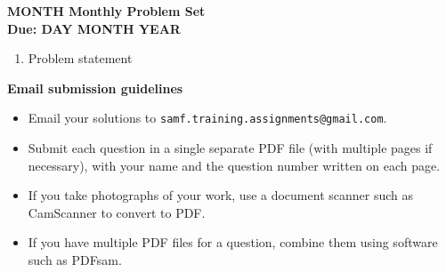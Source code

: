 \documentclass{article}
\begin{document}
\begin{center}
\textbf{\Large MONTH Monthly Problem Set}
\\ \vspace{1em}
\textbf{\large Due: DAY MONTH YEAR}
\end{center}

\begin{enumerate}[1.]

\item %
Problem statement

\end{enumerate}

\vfill
\textbf{\Large Email submission guidelines}
\begin{itemize}
	\item Email your solutions to \verb!samf.training.assignments@gmail.com!.
	\item Submit each question in a single separate PDF file (with multiple pages if necessary), with your name and the question number written on each page.
	\item If you take photographs of your work, use a document scanner such as CamScanner to convert to PDF.
	\item If you have multiple PDF files for a question, combine them using software such as PDFsam.
\end{itemize}
\end{document}
